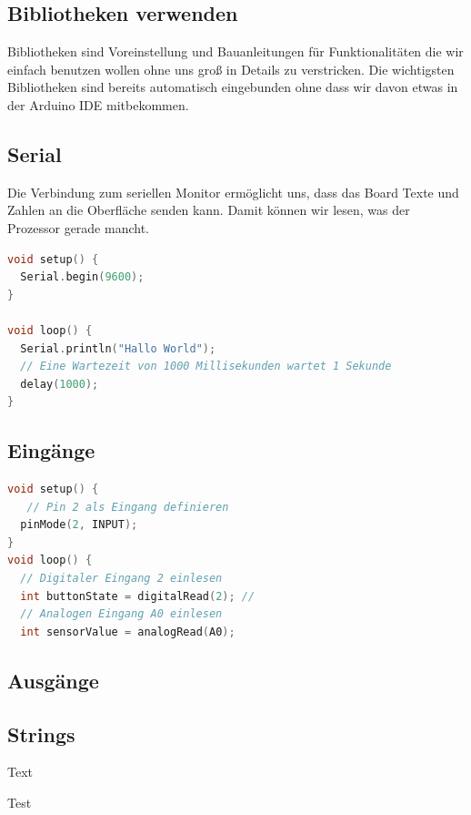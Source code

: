 \subsection{\large{Bibliotheken verwenden}}
Bibliotheken sind Voreinstellung und Bauanleitungen für Funktionalitäten die wir einfach benutzen wollen ohne uns groß in Details zu verstricken. Die wichtigsten Bibliotheken sind bereits automatisch eingebunden ohne dass wir davon etwas in der Arduino IDE mitbekommen.
\subsection{Serial}
Die Verbindung zum seriellen Monitor ermöglicht uns, dass das Board Texte und Zahlen an die Oberfläche senden kann. Damit können wir lesen, was der Prozessor gerade mancht. 
\begin{lstlisting}[language=c, caption=Beispiel]
void setup() {
  Serial.begin(9600);
}

void loop() {
  Serial.println("Hallo World");
  // Eine Wartezeit von 1000 Millisekunden wartet 1 Sekunde    
  delay(1000);        
}
\end{lstlisting}


\subsection{\large{Eingänge}}
\begin{lstlisting}[language=c, caption=Beispiel]
void setup() {
   // Pin 2 als Eingang definieren
  pinMode(2, INPUT); 
}
void loop() {
  // Digitaler Eingang 2 einlesen
  int buttonState = digitalRead(2); // 
  // Analogen Eingang A0 einlesen
  int sensorValue = analogRead(A0); 
\end{lstlisting}

\subsection{\large{Ausgänge}}

\newpage
\subsection{\large{Strings}}

Text

\begin{itemize*} %
	\item Test
\end{itemize*}

